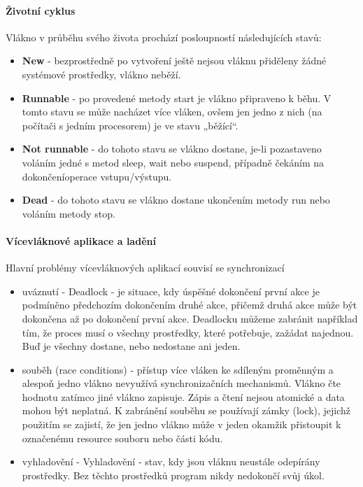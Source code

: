 \documentclass[10pt,a4paper]{article}
\begin{document}
\paragraph{Životní cyklus} 
Vlákno v průběhu svého života prochází posloupností následujících stavů:
\begin{itemize}
\item \textbf{New} - bezprostředně po vytvoření ještě nejsou vláknu přiděleny žádné systémové prostředky, vlákno neběží.
\item \textbf{Runnable} - po provedené metody start je vlákno připraveno k běhu. V tomto stavu se může nacházet více vláken, ovšem jen jedno z nich (na počítači s jedním procesorem) je ve stavu „běžící“.
\item \textbf{Not runnable} - do tohoto stavu se vlákno dostane, je-li pozastaveno voláním jedné s metod sleep, wait nebo suspend, případně čekáním na dokončeníoperace vstupu/výstupu.
\item \textbf{Dead} - do tohoto stavu se vlákno dostane ukončením metody run nebo voláním metody stop.
\end{itemize}
\paragraph{Vícevláknové aplikace a ladění}
Hlavní problémy vícevláknových aplikací souvisí se synchronizací
\begin{itemize}
\item uváznutí - Deadlock - je situace, kdy úspěšné dokončení první akce je podmíněno předchozím dokončením druhé akce, přičemž druhá akce může být dokončena až po dokončení první akce. Deadlocku můžeme zabránit například tím, že proces musí o všechny prostředky, které potřebuje, zažádat najednou. Buď je všechny dostane, nebo nedostane ani jeden. 
\item souběh (race conditions) - přístup více vláken ke sdíleným proměnným a alespoň jedno vlákno nevyužívá synchronizačních mechanismů. Vlákno čte hodnotu zatímco jiné vlákno zapisuje. Zápis a čtení nejsou atomické a data mohou být neplatná. K zabránění souběhu se používají zámky (lock), jejichž použitím se zajistí, že jen jedno vlákno může v jeden okamžik přistoupit k označenému resource souboru nebo části kódu.
\item vyhladovění - Vyhladovění - stav, kdy jsou vláknu neustále odepírány prostředky. Bez těchto prostředků program nikdy nedokončí svůj úkol.
\end{itemize}
\end{document}
